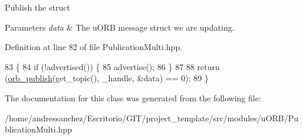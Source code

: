 Publish the struct 
\begin{DoxyParams}{Parameters}
{\em data} & The u\+O\+RB message struct we are updating. \\
\hline
\end{DoxyParams}


Definition at line 82 of file Publication\+Multi.\+hpp.


\begin{DoxyCode}
83     \{
84         \textcolor{keywordflow}{if} (!advertised()) \{
85             advertise();
86         \}
87 
88         \textcolor{keywordflow}{return} (\hyperlink{uORB_8cpp_af7a143a80b6b04689a3a4890ce8df4ae}{orb\_publish}(get\_topic(), \_handle, &data) == 0);
89     \}
\end{DoxyCode}


The documentation for this class was generated from the following file\+:\begin{DoxyCompactItemize}
\item 
/home/andressanchez/\+Escritorio/\+G\+I\+T/project\+\_\+template/src/modules/u\+O\+R\+B/Publication\+Multi.\+hpp\end{DoxyCompactItemize}
